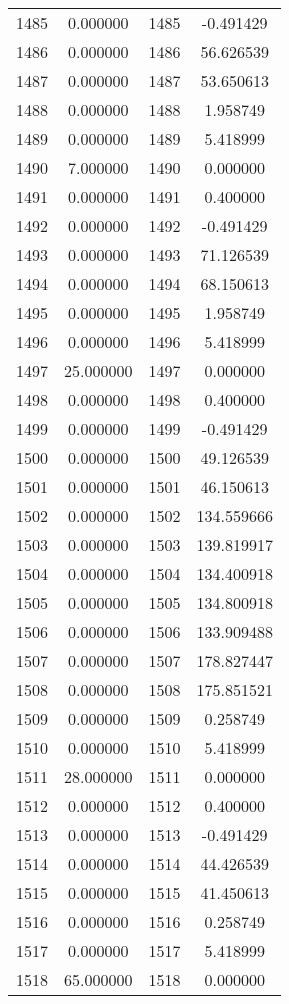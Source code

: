 \documentclass[12pt]{article}
\begin{document}
\begin{longtable}{@{}cccc@{}}
1485 & 0.000000 & 1485 & -0.491429 \\
1486 & 0.000000 & 1486 & 56.626539 \\
1487 & 0.000000 & 1487 & 53.650613 \\
1488 & 0.000000 & 1488 & 1.958749 \\
1489 & 0.000000 & 1489 & 5.418999 \\
1490 & 7.000000 & 1490 & 0.000000 \\
1491 & 0.000000 & 1491 & 0.400000 \\
1492 & 0.000000 & 1492 & -0.491429 \\
1493 & 0.000000 & 1493 & 71.126539 \\
1494 & 0.000000 & 1494 & 68.150613 \\
1495 & 0.000000 & 1495 & 1.958749 \\
1496 & 0.000000 & 1496 & 5.418999 \\
1497 & 25.000000 & 1497 & 0.000000 \\
1498 & 0.000000 & 1498 & 0.400000 \\
1499 & 0.000000 & 1499 & -0.491429 \\
1500 & 0.000000 & 1500 & 49.126539 \\
1501 & 0.000000 & 1501 & 46.150613 \\
1502 & 0.000000 & 1502 & 134.559666 \\
1503 & 0.000000 & 1503 & 139.819917 \\
1504 & 0.000000 & 1504 & 134.400918 \\
1505 & 0.000000 & 1505 & 134.800918 \\
1506 & 0.000000 & 1506 & 133.909488 \\
1507 & 0.000000 & 1507 & 178.827447 \\
1508 & 0.000000 & 1508 & 175.851521 \\
1509 & 0.000000 & 1509 & 0.258749 \\
1510 & 0.000000 & 1510 & 5.418999 \\
1511 & 28.000000 & 1511 & 0.000000 \\
1512 & 0.000000 & 1512 & 0.400000 \\
1513 & 0.000000 & 1513 & -0.491429 \\
1514 & 0.000000 & 1514 & 44.426539 \\
1515 & 0.000000 & 1515 & 41.450613 \\
1516 & 0.000000 & 1516 & 0.258749 \\
1517 & 0.000000 & 1517 & 5.418999 \\
1518 & 65.000000 & 1518 & 0.000000 \\

\end{longtable}
\end{document}
